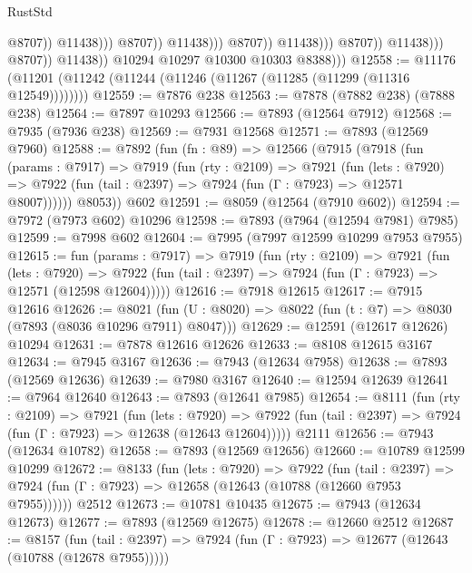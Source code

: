 \begin{lexlean}{RustStd}
\begin{coremodule}
                                                          @8707))
                                                      @11438)))
                                                @8707))
                                            @11438)))
                                      @8707))
                                  @11438)))
                            @8707))
                        @11438)))
                  @8707))
              @11438))
          @10294
          @10297
          @10300
          @10303
          @8388)))
@12558 := @11176 (@11201 (@11242 (@11244 (@11246 (@11267 (@11285 (@11299 (@11316 @12549))))))))
@12559 := @7876 @238
@12563 := @7878 (@7882 @238) (@7888 @238)
@12564 := @7897 @10293
@12566 := @7893 (@12564 @7912)
@12568 := @7935 (@7936 @238)
@12569 := @7931 @12568
@12571 := @7893 (@12569 @7960)
@12588 := @7892
    (fun (fn : @89) =>
    @12566
      (@7915
        (@7918
          (fun (params : @7917) =>
          @7919
            (fun (rty : @2109) =>
            @7921
              (fun (lets : @7920) =>
              @7922 (fun (tail : @2397) => @7924 (fun (Γ : @7923) => @12571 @8007))))))
        @8053))
    @602
@12591 := @8059 (@12564 (@7910 @602))
@12594 := @7972 (@7973 @602) @10296
@12598 := @7893 (@7964 (@12594 @7981) @7985)
@12599 := @7998 @602
@12604 := @7995 (@7997 @12599 @10299 @7953 @7955)
@12615 := fun (params : @7917) =>
  @7919
    (fun (rty : @2109) =>
    @7921
      (fun (lets : @7920) =>
      @7922 (fun (tail : @2397) => @7924 (fun (Γ : @7923) => @12571 (@12598 @12604)))))
@12616 := @7918 @12615
@12617 := @7915 @12616
@12626 := @8021
    (fun (U : @8020) => @8022 (fun (t : @7) => @8030 (@7893 (@8036 @10296 @7911) @8047)))
@12629 := @12591 (@12617 @12626) @10294
@12631 := @7878 @12616 @12626
@12633 := @8108 @12615 @3167
@12634 := @7945 @3167
@12636 := @7943 (@12634 @7958)
@12638 := @7893 (@12569 @12636)
@12639 := @7980 @3167
@12640 := @12594 @12639
@12641 := @7964 @12640
@12643 := @7893 (@12641 @7985)
@12654 := @8111
    (fun (rty : @2109) =>
    @7921
      (fun (lets : @7920) =>
      @7922 (fun (tail : @2397) => @7924 (fun (Γ : @7923) => @12638 (@12643 @12604)))))
    @2111
@12656 := @7943 (@12634 @10782)
@12658 := @7893 (@12569 @12656)
@12660 := @10789 @12599 @10299
@12672 := @8133
    (fun (lets : @7920) =>
    @7922
      (fun (tail : @2397) =>
      @7924 (fun (Γ : @7923) => @12658 (@12643 (@10788 (@12660 @7953 @7955))))))
    @2512
@12673 := @10781 @10435
@12675 := @7943 (@12634 @12673)
@12677 := @7893 (@12569 @12675)
@12678 := @12660 @2512
@12687 := @8157
    (fun (tail : @2397) => @7924 (fun (Γ : @7923) => @12677 (@12643 (@10788 (@12678 @7955)))))

\end{coremodule}
\end{lexlean}
